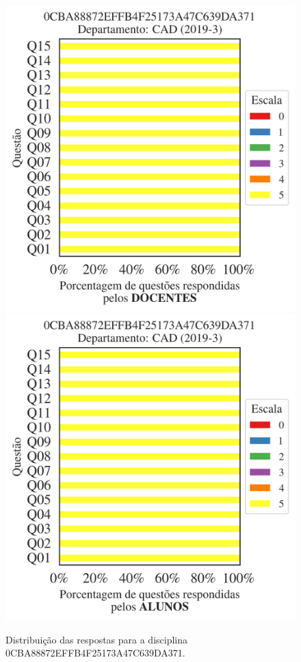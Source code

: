 \documentclass[a4paper,10pt]{article}
\begin{document}
\begin{figure}[h]
\centering
\includegraphics[width=0.485\linewidth]{analise_disciplina_departamento_CAD_0CBA88872EFFB4F25173A47C639DA371_docentes.png}
\includegraphics[width=0.485\linewidth]{analise_disciplina_departamento_CAD_0CBA88872EFFB4F25173A47C639DA371_alunos.png}
\caption{\label{fig:analise_geral_departamento}                Distribuição das respostas para a disciplina 0CBA88872EFFB4F25173A47C639DA371. }
\end{figure}
\end{document}
